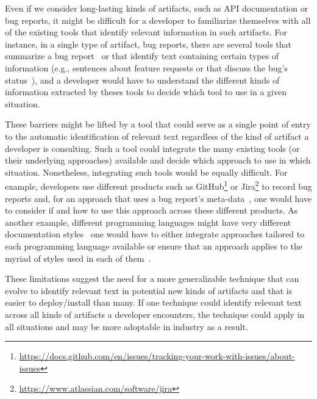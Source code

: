 Even if we consider long-lasting kinds of artifacts, such as API documentation or bug reports,
it might be difficult for a developer to familiarize themselves 
with all of the existing tools that identify relevant information in such artifacts. 
For instance, in a single type of artifact, bug reports, there are several tools that 
summarize a bug report~\cite{Rastkar2010, Lotufo2012,li2018deep}
or that identify text containing certain types of information (e.g., sentences about feature requests or that discuss the bug's status~\cite{huang2018automating, Arya2019}),
and a developer would have to understand the different kinds of information 
extracted by theses tools to decide which tool to use in a given situation. 



These barriers might be lifted by a tool that could serve as a single point of entry to the automatic identification of relevant text regardless of the kind of artifact a developer is consulting.
Such a tool could integrate the many existing tools (or their underlying approaches) available and decide which approach 
to use in which situation. Nonetheless, 
integrating such tools 
would be equally difficult.
For example, developers use
different products 
such as 
GitHub\footnote{\url{https://docs.github.com/en/issues/tracking-your-work-with-issues/about-issues}} 
or Jira\footnote{\url{https://www.atlassian.com/software/jira}}
to record bug reports
and, for 
an approach that uses a bug report's meta-data~\cite{Lotufo2012,li2018deep},
one would have to consider if and how to use this approach across these different products.
As another example, different programming languages
might have very different documentation styles~\cite{endrikat2014} 
one would have to either integrate approaches tailored to each programming language available 
or ensure that an approach applies to the myriad of styles used in each of them~\cite{robillard2011field}.



These limitations suggest the need for a more generalizable technique
that can evolve to 
identify relevant text in potential new kinds of artifacts 
and that is easier to deploy/install than many.
If one technique could identify relevant text across all kinds
of artifacts a developer encounters, the technique
could apply in all situations and may be more adoptable in industry
as a result. 







